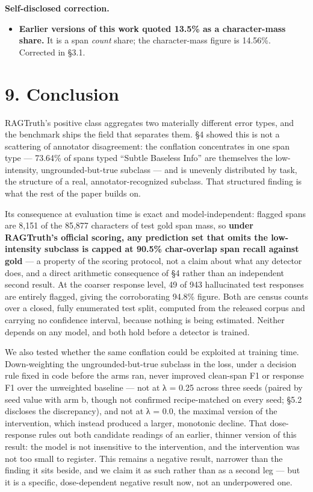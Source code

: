 \documentclass[11pt]{article}
\providecommand{\tightlist}{\setlength{\itemsep}{0pt}\setlength{\parskip}{0pt}}
\begin{document}
\textbf{Self-disclosed correction.}

\begin{itemize}
\tightlist
\item
  \textbf{Earlier versions of this work quoted 13.5\% as a character-mass share.} It is a span
  \emph{count} share; the character-mass figure is 14.56\%. Corrected in §3.1.
\end{itemize}

\section{9. Conclusion}\label{conclusion}

RAGTruth's positive class aggregates two materially different error types, and the benchmark
ships the field that separates them. §4 showed this is not a scattering of annotator
disagreement: the conflation concentrates in one span type --- 73.64\% of spans typed ``Subtle
Baseless Info'' are themselves the low-intensity, ungrounded-but-true subclass --- and is
unevenly distributed by task, the structure of a real, annotator-recognized subclass. That
structured finding is what the rest of the paper builds
on.

Its consequence at evaluation time is exact and model-independent: flagged spans are 8,151
of the 85,877 characters of test gold span mass, so \textbf{under RAGTruth's official scoring, any
prediction set that omits the low-intensity subclass is capped at 90.5\% char-overlap span
recall against gold} --- a property of the scoring protocol, not a claim about what any
detector does, and a direct arithmetic consequence of §4 rather than an independent second
result. At the coarser response level, 49 of 943 hallucinated test responses are entirely
flagged, giving the corroborating 94.8\% figure. Both are census counts over a closed, fully
enumerated test split, computed from the released corpus and carrying no confidence
interval, because nothing is being estimated. Neither depends on any model, and both hold
before a detector is trained.

We also tested whether the same conflation could be exploited at training time.
Down-weighting the ungrounded-but-true subclass in the loss, under a decision rule fixed in
code before the arms ran, never improved clean-span F1 or response F1 over the unweighted
baseline --- not at λ = 0.25 across three seeds (paired by seed value with arm b, though not
confirmed recipe-matched on every seed; §5.2 discloses the discrepancy), and not at λ = 0.0,
the maximal version of the intervention, which instead produced a larger, monotonic decline.
That
dose-response rules out both candidate readings of an earlier, thinner version of this
result: the model is not insensitive to the intervention, and the intervention was not too
small to register. This remains a negative result, narrower than the finding it sits beside,
and we claim it as such rather than as a second leg --- but it is a specific, dose-dependent
negative result now, not an underpowered one.
\end{document}
